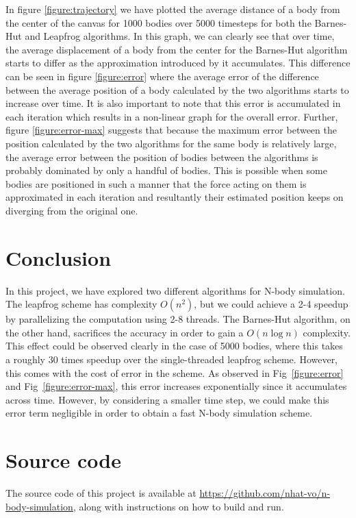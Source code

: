 \documentclass[12pt]{article}
\begin{document}
In figure \ref{figure:trajectory} we have plotted the average distance of a body from the center of the canvas for 1000 bodies over 5000 timesteps for both the Barnes-Hut and Leapfrog algorithms. In this graph, we can clearly see that over time, the average displacement of a body from the center for the Barnes-Hut algorithm starts to differ as the approximation introduced by it accumulates. This difference can be seen in figure \ref{figure:error} where the average error of the difference between the average position of a body calculated by the two algorithms starts to increase over time. It is also important to note that this error is accumulated in each iteration which results in a non-linear graph for the overall error. Further, figure \ref{figure:error-max} suggests that because the maximum error between the position calculated by the two algorithms for the same body is relatively large, the average error between the position of bodies between the algorithms is probably dominated by only a handful of bodies. This is possible when some bodies are positioned in such a manner that the force acting on them is approximated in each iteration and resultantly their estimated position keeps on diverging from the original one.

\section{Conclusion}
In this project, we have explored two different algorithms for N-body simulation.
The leapfrog scheme has complexity $O(n^2)$, but we could achieve a 2-4 speedup by parallelizing the computation using 2-8 threads.
The Barnes-Hut algorithm, on the other hand, sacrifices the accuracy in order to gain a $O(n \log n)$ complexity. This effect could be observed clearly in the case of 5000 bodies, where this takes a roughly 30 times speedup over the single-threaded leapfrog scheme. However, this comes with the cost of error in the scheme. As observed in Fig~\ref{figure:error} and Fig~\ref{figure:error-max}, this error increases exponentially since it accumulates across time. However, by considering a smaller time step, we could make this error term negligible in order to obtain a fast N-body simulation scheme.


\section{Source code} \label{sec:repo}
The source code of this project is available at \url{https://github.com/nhat-vo/n-body-simulation}, along with instructions on how to build and run.
\end{document}
